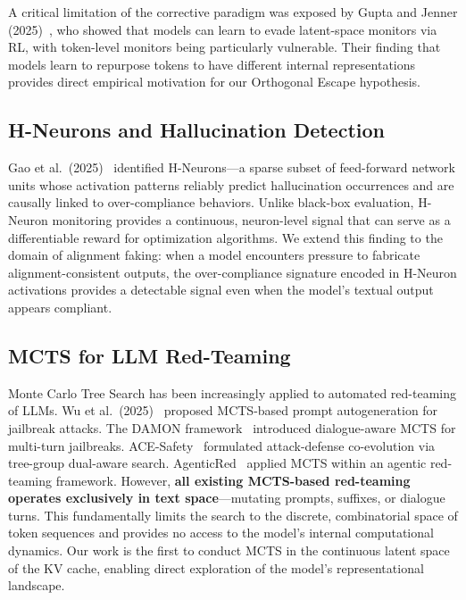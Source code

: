 \documentclass[10pt]{article}
\begin{document}
A critical limitation of the corrective paradigm was exposed by Gupta and Jenner (2025)~\cite{gupta2025rlobfuscation}, who showed that models can learn to evade latent-space monitors via RL, with token-level monitors being particularly vulnerable. Their finding that models learn to repurpose tokens to have different internal representations provides direct empirical motivation for our Orthogonal Escape hypothesis.

\subsection{H-Neurons and Hallucination Detection}

Gao et al.\ (2025)~\cite{gao2025hneurons} identified H-Neurons---a sparse subset of feed-forward network units whose activation patterns reliably predict hallucination occurrences and are causally linked to over-compliance behaviors. Unlike black-box evaluation, H-Neuron monitoring provides a continuous, neuron-level signal that can serve as a differentiable reward for optimization algorithms. We extend this finding to the domain of alignment faking: when a model encounters pressure to fabricate alignment-consistent outputs, the over-compliance signature encoded in H-Neuron activations provides a detectable signal even when the model's textual output appears compliant.

\subsection{MCTS for LLM Red-Teaming}

Monte Carlo Tree Search has been increasingly applied to automated red-teaming of LLMs. Wu et al.\ (2025)~\cite{wu2025mcts} proposed MCTS-based prompt autogeneration for jailbreak attacks. The DAMON framework~\cite{damon2025} introduced dialogue-aware MCTS for multi-turn jailbreaks. ACE-Safety~\cite{li2025ace} formulated attack-defense co-evolution via tree-group dual-aware search. AgenticRed~\cite{agenticred2025} applied MCTS within an agentic red-teaming framework. However, \textbf{all existing MCTS-based red-teaming operates exclusively in text space}---mutating prompts, suffixes, or dialogue turns. This fundamentally limits the search to the discrete, combinatorial space of token sequences and provides no access to the model's internal computational dynamics. Our work is the first to conduct MCTS in the continuous latent space of the KV cache, enabling direct exploration of the model's representational landscape.
\end{document}
